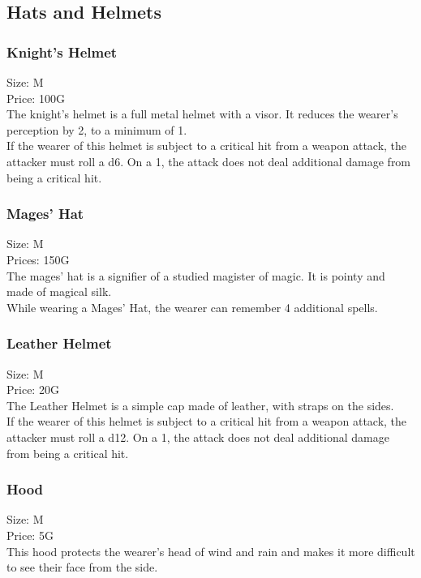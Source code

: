 \subsection{Hats and Helmets}

\subsubsection{Knight's Helmet}
Size: M\\
Price: 100G\\
The knight's helmet is a full metal helmet with a visor.
It reduces the wearer's perception by 2, to a minimum of 1.\\
If the wearer of this helmet is subject to a critical hit from a weapon attack, the attacker must roll a d6.
On a 1, the attack does not deal additional damage from being a critical hit.\\

\subsubsection{Mages' Hat}
Size: M\\
Prices: 150G\\
The mages' hat is a signifier of a studied magister of magic.
It is pointy and made of magical silk.\\
While wearing a Mages' Hat, the wearer can remember 4 additional spells.\\

\subsubsection{Leather Helmet}
Size: M\\
Price: 20G\\
The Leather Helmet is a simple cap made of leather, with straps on the sides.\\
If the wearer of this helmet is subject to a critical hit from a weapon attack, the attacker must roll a d12.
On a 1, the attack does not deal additional damage from being a critical hit.\\

\subsubsection{Hood}
Size: M\\
Price: 5G\\
This hood protects the wearer's head of wind and rain and makes it more difficult to see their face from the side.\\

